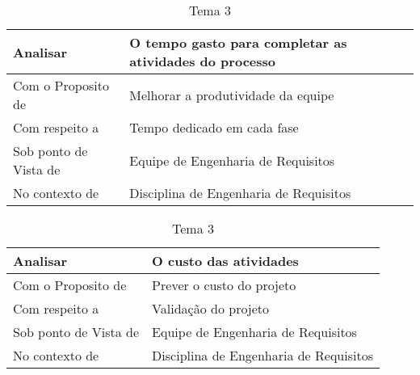 \begin{table}[H]
\centering
\caption{Tema 3}
\label{my-label}
\begin{tabular}{|l|l|}
\hline
Analisar              & O tempo gasto para completar as atividades do processo  \\ \hline
Com o Proposito de    & Melhorar a produtividade da equipe 						\\ \hline
Com respeito a        & Tempo dedicado em cada fase     						\\ \hline
Sob ponto de Vista de & Equipe de Engenharia de Requisitos                      \\ \hline
No contexto de        & Disciplina de Engenharia de Requisitos         			\\ \hline
\end{tabular}
\end{table}

\begin{table}[H]
\centering
\caption{Tema 3}
\label{my-label}
\begin{tabular}{|l|l|}
\hline
Analisar              & O custo das atividades  \\ \hline
Com o Proposito de    & Prever o custo do projeto						\\ \hline
Com respeito a        & Validação do projeto    						\\ \hline
Sob ponto de Vista de & Equipe de Engenharia de Requisitos                      \\ \hline
No contexto de        & Disciplina de Engenharia de Requisitos         			\\ \hline
\end{tabular}
\end{table}

